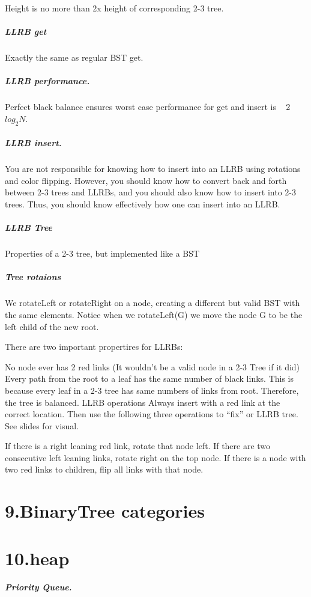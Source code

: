 \documentclass[UTF8]{ctexart}
\begin{document}
Height is no more than 2x height of corresponding 2-3 tree.

\subparagraph{LLRB get}

Exactly the same as regular BST get.

\subparagraph{LLRB performance. }

Perfect black balance ensures worst case performance for get and insert is ~ 2 $log_2 N$.


\subparagraph{LLRB insert. }

You are not responsible for knowing how to insert into an LLRB using rotations and color flipping. 
However, you should know how to convert back and forth between 2-3 trees and LLRBs, 
and you should also know how to insert into 2-3 trees. 
Thus, you should know effectively how one can insert into an LLRB.


\subparagraph{LLRB Tree}
Properties of a 2-3 tree, but implemented like a BST


\subparagraph{Tree rotaions}
We rotateLeft or rotateRight on a node, creating a different but valid BST with the same elements. 
Notice when we rotateLeft(G) we move the node G to be the left child of the new root.


There are two important propertires for LLRBs:

No node ever has 2 red links (It wouldn’t be a valid node in a 2-3 Tree if it did)
Every path from the root to a leaf has the same number of black links. 
This is because every leaf in a 2-3 tree has same numbers of links from root. Therefore, the tree is balanced.
LLRB operations Always insert with a red link at the correct location. 
Then use the following three operations to “fix” or LLRB tree. See slides for visual.

If there is a right leaning red link, rotate that node left.
If there are two consecutive left leaning links, rotate right on the top node.
If there is a node with two red links to children, flip all links with that node.
\newpage
\section*{9.BinaryTree categories}

\newpage
\section*{10.heap}




\subparagraph{Priority Queue. }
\end{document}
